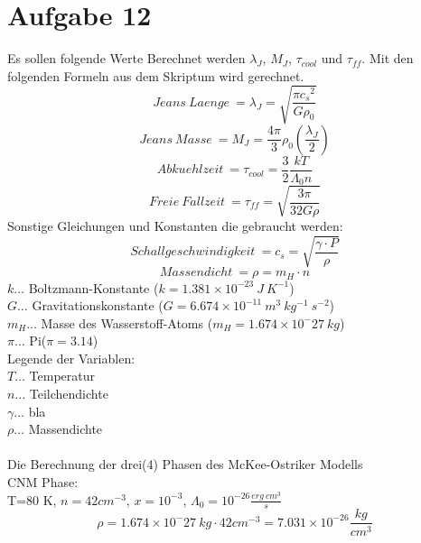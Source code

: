 \section{Aufgabe 12}
Es sollen folgende Werte Berechnet werden $\lambda_J$, $M_J$, $\tau_{cool}$ und $\tau_{ff}$. Mit den folgenden Formeln aus dem Skriptum wird gerechnet.
\begin{equation}{Jeans ~ Laenge ~ }
= \lambda_{J}=\sqrt{\frac{\pi {c_s}^2}{G \rho_0}}
\end{equation}
\begin{equation}{Jeans ~ Masse ~ }
= M_{J}=\frac{4 \pi}{3} \rho_0 \left ( \frac{\lambda_J}{2} \right)
\end{equation}
\begin{equation}{Abkuehlzeit ~ }
= \tau_{cool}=\frac{3}{2} \frac{k T}{\Lambda_0 n}
\end{equation}
\begin{equation}{Freie ~ Fallzeit ~ }
= \tau_{ff}=\sqrt{\frac{3 \pi}{32 G \rho}}
\end{equation}
Sonstige Gleichungen und Konstanten die gebraucht werden:
\begin{equation}{Schallgeschwindigkeit ~ }
= c_{s}=\sqrt{\frac{\gamma \cdot P}{\rho}}
\end{equation}
\begin{equation}{Massendicht ~ }
= \rho=m_H \cdot n
\end{equation}
\(k\dots\) Boltzmann-Konstante (\(k = 1.381 \times 10^{-23}~J~K^{-1}\))\\
\(G\dots\) Gravitationskonstante (\(G = 6.674 \times 10^{-11}~m^3~kg^{-1}~s^{-2}\))\\
\(m_H\dots\) Masse des Wasserstoff-Atoms (\(m_H = 1.674 \times 10^-27~kg\))\\
\(\pi\dots\) Pi(\(\pi=3.14\))\\
Legende der Variablen:\\
\(T\dots\) Temperatur\\
\(n\dots\) Teilchendichte\\
\(\gamma\dots\) bla\\
\(\rho\dots\) Massendichte\\
\\
Die Berechnung der drei(4) Phasen des McKee-Ostriker Modells \\
CNM Phase: \\
T=80 K, $n = 42 cm^{-3}$, $x=10^{-3}$, $\Lambda_0 = 10^{-26} \frac{erg~cm^3}{s}$\\
\begin{equation}
\rho=1.674 \times 10^-27~kg \cdot 42 cm^{-3} = 7.031 \times 10^{-26} \frac{kg}{cm^3}
\end{equation}
